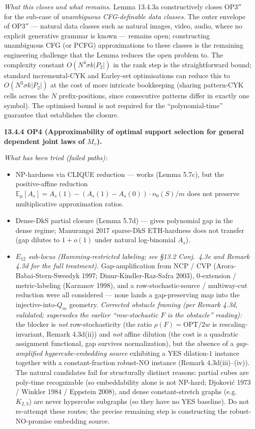 \documentclass[
]{article}
\begin{document}
\emph{What this closes and what remains.} Lemma 13.4.3a constructively
closes OP3$''$ for the sub-case of \emph{unambiguous CFG-definable
data classes}. The outer envelope of OP3$''$ --- natural data classes
such as natural images, video, audio, where no explicit generative
grammar is known --- remains open; constructing unambiguous CFG (or
PCFG) approximations to these classes is the remaining engineering
challenge that the Lemma reduces the open problem to. The complexity
constant $O(N^4 \sigma k |P_2|)$ in the rank step is the
straightforward bound; standard incremental-CYK and Earley-set
optimisations can reduce this to $O(N^3 \sigma k |P_2|)$ at the cost
of more intricate bookkeeping (sharing pattern-CYK cells across the
$N$ prefix-positions, since consecutive patterns differ in exactly
one symbol). The optimised bound is not required for the
``polynomial-time'' guarantee that establishes the closure.

\textbf{13.4.4 OP4 (Approximability of optimal support selection for
general dependent joint laws of $M_v$).}

\emph{What has been tried (failed paths):}
\begin{itemize}
\item NP-hardness via CLIQUE reduction --- works (Lemma 5.7c), but
the positive-affine reduction $\mathbb{E}_\mu[A_s] = A_s(1) -
(A_s(1) - A_s(0)) \cdot n_0(S)/m$ does not preserve multiplicative
approximation ratios.
\item Dense-DkS partial closure (Lemma 5.7d) --- gives polynomial gap
in the dense regime; Manurangsi 2017 sparse-DkS ETH-hardness does
not transfer (gap dilutes to $1 + o(1)$ under natural log-binomial
$A_s$).
\item \emph{$E_{12}$ sub-locus (Hamming-restricted labeling; see §13.2
Conj.\ 4.3e and Remark 4.3d for the full treatment).} Gap-amplification
from NCP / CVP (Arora-Babai-Stern-Sweedyk 1997; Dinur-Kindler-Raz-Safra
2003), $0$-extension / metric-labeling (Karzanov 1998), and a
row-stochastic-source / multiway-cut reduction were all considered ---
none lands a gap-preserving map into the injective-into-$Q_m$ geometry.
\emph{Corrected obstacle framing (per Remark 4.3d, validated; supersedes
the earlier ``row-stochastic $F$ is the obstacle'' reading):} the
blocker is \emph{not} row-stochasticity (the ratio $\rho(F)=\mathrm{OPT}/2w$
is rescaling-invariant, Remark 4.3d(ii)) and \emph{not} affine dilution
(the cost is a quadratic assignment functional, gap survives
normalization), but the absence of a \emph{gap-amplified hypercube-embedding
source} exhibiting a YES dilation-$1$ instance together with a
constant-fraction robust-NO instance (Remark 4.3d(iii)--(iv)). The natural
candidates fail for structurally distinct reasons: partial cubes are
poly-time recognizable (so embeddability alone is not NP-hard;
Djokovi\'c 1973 / Winkler 1984 / Eppstein 2008), and dense
constant-stretch graphs (e.g.\ $K_{2,3}$) are never hypercube subgraphs
(so they have no YES baseline). Do not re-attempt these routes; the
precise remaining step is constructing the robust-NO-promise embedding
source.
\end{itemize}
\end{document}
